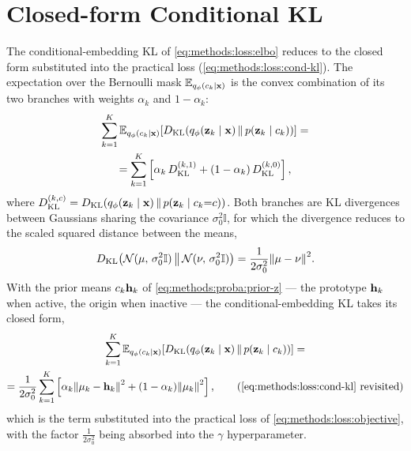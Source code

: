 \chapter{Closed-form Conditional KL} \label{app:vaee:cond-kl}


The conditional-embedding \ac{KL} of \cref{eq:methods:loss:elbo}
reduces to the closed form substituted into the practical loss
(\cref{eq:methods:loss:cond-kl}). The expectation over the
Bernoulli mask $\mathbb{E}_{q_\phi(c_k \mid \vb{x})}$ is the convex combination
of its two branches with weights $\alpha_k$ and $1 - \alpha_k$:
\begin{multline*}
    \sum_{k=1}^{K} \E[q_\phi(c_k \mid \vb{x})]{ \KL{q_\phi(\vb{z}_k \mid \vb{x})}{p(\vb{z}_k \mid c_k)}} =\\
    = \sum_{k=1}^{K} \left[ \alpha_k\, D_{\mathrm{KL}}^{(k,1)} + (1 - \alpha_k)\, D_{\mathrm{KL}}^{(k,0)}
    \right],
\end{multline*}
where $D_{\mathrm{KL}}^{(k,c)} = \KL{q_\phi(\vb{z}_k \mid \vb{x})}{p(\vb{z}_k
\mid c_k {=} c)}$. Both branches are \ac{KL} divergences between Gaussians
sharing the covariance $\sigma_0^2 \mathbb{I}$, for which the divergence reduces
to the scaled squared distance between the means,
\begin{equation*}
    \KL{\mathcal{N}(\vb{\mu}, \,\sigma_0^2 \mathbb{I})}{\mathcal{N}(\vb{\nu}, \,\sigma_0^2 \mathbb{I})}
    = \frac{1}{2 \sigma_0^2}{\norm{\vb{\mu} - \vb{\nu}}^2}.
\end{equation*}
With the prior means $c_k \vb{h}_k$ of \cref{eq:methods:proba:prior-z}
--- the prototype $\vb{h}_k$ when active, the origin when
inactive --- the conditional-embedding \ac{KL} takes its closed form,
\begin{multline}
    \sum_{k=1}^{K} \E[q_\phi(c_k \mid \vb{x})]{\KL{q_\phi(\vb{z}_k \mid \vb{x})}{p(\vb{z}_k \mid c_k)}} =\\
    = \frac{1}{2\sigma_0^2} \sum_{k=1}^{K} \left[ \alpha_k \norm{\vb{\mu}_k - \vb{h}_k}^2 + (1 - \alpha_k) \norm{\vb{\mu}_k}^2 \right],
    \tag{\ref{eq:methods:loss:cond-kl} revisited}
\end{multline}
which is the term substituted into the practical loss of
\cref{eq:methods:loss:objective}, with the factor $\tfrac{1}{2
\sigma^{2}_{0}}$ being absorbed into the $\gamma$ hyperparameter.
